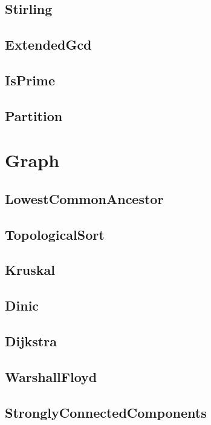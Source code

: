 \documentclass[titlepage, landscape, a4paper, twocolumn, 10pt]{jarticle}
\begin{document}
\subsection{Stirling}


\subsection{ExtendedGcd}


\subsection{IsPrime}


\subsection{Partition}



\section{Graph}

\subsection{LowestCommonAncestor}


\subsection{TopologicalSort}


\subsection{Kruskal}


\subsection{Dinic}


\subsection{Dijkstra}


\subsection{WarshallFloyd}


\subsection{StronglyConnectedComponents}

\end{document}
